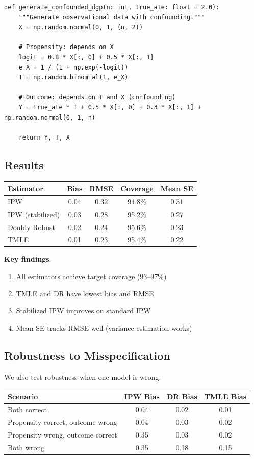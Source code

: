 \begin{verbatim}
def generate_confounded_dgp(n: int, true_ate: float = 2.0):
    """Generate observational data with confounding."""
    X = np.random.normal(0, 1, (n, 2))

    # Propensity: depends on X
    logit = 0.8 * X[:, 0] + 0.5 * X[:, 1]
    e_X = 1 / (1 + np.exp(-logit))
    T = np.random.binomial(1, e_X)

    # Outcome: depends on T and X (confounding)
    Y = true_ate * T + 0.5 * X[:, 0] + 0.3 * X[:, 1] + np.random.normal(0, 1, n)

    return Y, T, X
\end{verbatim}

\subsection{Results}

\begin{center}
\begin{tabular}{lcccc}
\toprule
Estimator & Bias & RMSE & Coverage & Mean SE \\
\midrule
IPW & 0.04 & 0.32 & 94.8\% & 0.31 \\
IPW (stabilized) & 0.03 & 0.28 & 95.2\% & 0.27 \\
Doubly Robust & 0.02 & 0.24 & 95.6\% & 0.23 \\
TMLE & 0.01 & 0.23 & 95.4\% & 0.22 \\
\bottomrule
\end{tabular}
\end{center}

\textbf{Key findings}:
\begin{enumerate}
    \item All estimators achieve target coverage (93--97\%)
    \item TMLE and DR have lowest bias and RMSE
    \item Stabilized IPW improves on standard IPW
    \item Mean SE tracks RMSE well (variance estimation works)
\end{enumerate}

\subsection{Robustness to Misspecification}

We also test robustness when one model is wrong:

\begin{center}
\begin{tabular}{lccc}
\toprule
Scenario & IPW Bias & DR Bias & TMLE Bias \\
\midrule
Both correct & 0.04 & 0.02 & 0.01 \\
Propensity correct, outcome wrong & 0.04 & 0.03 & 0.02 \\
Propensity wrong, outcome correct & 0.35 & 0.03 & 0.02 \\
Both wrong & 0.35 & 0.18 & 0.15 \\
\bottomrule
\end{tabular}
\end{center}

